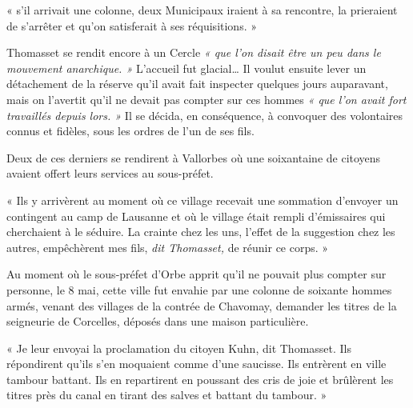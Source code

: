 \documentclass[french,twoside]{book} %
\newenvironment{quoteblock}%
  {\begin{quoting}}
  {\end{quoting}}
\newenvironment{quotebar}{%
    \def\FrameCommand{{\color{rubric!10!}\vrule width 0.5em} \hspace{0.9em}}%
    \def\OuterFrameSep{\itemsep} %
    \MakeFramed {\advance\hsize-\width \FrameRestore}
  }%
  {%
    \endMakeFramed
  }
\renewenvironment{quoteblock}%
  {%
    \savenotes
    \setstretch{0.9}
    \begin{quotebar}
  }
  {%
    \end{quotebar}
    \spewnotes
  }
\begin{document}
\begin{quoteblock}
\noindent « s’il arrivait une colonne, deux Municipaux iraient à sa rencontre, la prieraient de s’arrêter et qu’on satisferait à ses réquisitions. »\end{quoteblock}

\noindent Thomasset se rendit encore à un Cercle \emph{« que l’on disait être un peu dans le mouvement anarchique. »} L’accueil fut glacial… Il voulut ensuite lever un détachement de la réserve qu’il avait fait inspecter quelques jours auparavant, mais on l’avertit qu’il ne devait pas compter sur ces hommes \emph{« que l’on avait fort travaillés depuis lors. »} Il se décida, en conséquence, à convoquer des volontaires connus et fidèles, sous les ordres de l’un de ses fils.\par
Deux de ces derniers se rendirent à Vallorbes où une soixantaine de citoyens avaient offert leurs services au sous-préfet.\par

\begin{quoteblock}
 \noindent « Ils y arrivèrent au moment où ce village recevait une sommation d’envoyer un contingent au camp de Lausanne et où le village était rempli d’émissaires qui cherchaient à le séduire. La crainte chez les uns, l’effet de la suggestion chez les autres, empêchèrent mes fils, \emph{dit Thomasset, }de réunir ce corps. »
 \end{quoteblock}

\noindent Au moment où le sous-préfet d’Orbe apprit qu’il ne pouvait plus compter sur personne, le 8 mai, cette ville fut envahie par une colonne de soixante hommes armés, venant des villages de la contrée de Chavomay, demander les titres de la seigneurie de Corcelles, déposés dans une maison particulière.\par

\begin{quoteblock}
 \noindent « Je leur envoyai la proclamation du citoyen Kuhn, dit Thomasset. Ils répondirent qu’ils s’en moquaient comme d’une saucisse. Ils entrèrent en ville tambour battant. Ils en repartirent en poussant des cris de joie et brûlèrent les titres près du canal en tirant des salves et battant du tambour. »
 \end{quoteblock}
\end{document}
